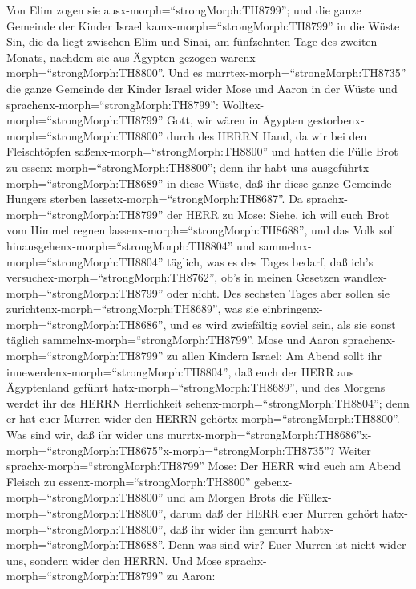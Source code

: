  Von Elim zogen sie ausx-morph=``strongMorph:TH8799''; und
die ganze Gemeinde der Kinder Israel kamx-morph=``strongMorph:TH8799''
in die Wüste Sin, die da liegt zwischen Elim und Sinai, am fünfzehnten
Tage des zweiten Monats, nachdem sie aus Ägypten gezogen
warenx-morph=``strongMorph:TH8800''.  Und es
murrtex-morph=``strongMorph:TH8735'' die ganze Gemeinde der Kinder
Israel wider Mose und Aaron in der Wüste  und
sprachenx-morph=``strongMorph:TH8799'':
Wolltex-morph=``strongMorph:TH8799'' Gott, wir wären in Ägypten
gestorbenx-morph=``strongMorph:TH8800'' durch des HERRN Hand, da wir bei
den Fleischtöpfen saßenx-morph=``strongMorph:TH8800'' und hatten die
Fülle Brot zu essenx-morph=``strongMorph:TH8800''; denn ihr habt uns
ausgeführtx-morph=``strongMorph:TH8689'' in diese Wüste, daß ihr diese
ganze Gemeinde Hungers sterben lassetx-morph=``strongMorph:TH8687''.
 Da sprachx-morph=``strongMorph:TH8799'' der HERR zu Mose:
Siehe, ich will euch Brot vom Himmel regnen
lassenx-morph=``strongMorph:TH8688'', und das Volk soll
hinausgehenx-morph=``strongMorph:TH8804'' und
sammelnx-morph=``strongMorph:TH8804'' täglich, was es des Tages bedarf,
daß ich's versuchex-morph=``strongMorph:TH8762'', ob's in meinen
Gesetzen wandlex-morph=``strongMorph:TH8799'' oder nicht. 
Des sechsten Tages aber sollen sie
zurichtenx-morph=``strongMorph:TH8689'', was sie
einbringenx-morph=``strongMorph:TH8686'', und es wird zwiefältig soviel
sein, als sie sonst täglich sammelnx-morph=``strongMorph:TH8799''.
 Mose und Aaron sprachenx-morph=``strongMorph:TH8799'' zu
allen Kindern Israel: Am Abend sollt ihr
innewerdenx-morph=``strongMorph:TH8804'', daß euch der HERR aus
Ägyptenland geführt hatx-morph=``strongMorph:TH8689'',  und
des Morgens werdet ihr des HERRN Herrlichkeit
sehenx-morph=``strongMorph:TH8804''; denn er hat euer Murren wider den
HERRN gehörtx-morph=``strongMorph:TH8800''. Was sind wir, daß ihr wider
uns
murrtx-morph=``strongMorph:TH8686''\textbar x-morph=``strongMorph:TH8675''x-morph=``strongMorph:TH8735''?
 Weiter sprachx-morph=``strongMorph:TH8799'' Mose: Der HERR
wird euch am Abend Fleisch zu essenx-morph=``strongMorph:TH8800''
gebenx-morph=``strongMorph:TH8800'' und am Morgen Brots die
Füllex-morph=``strongMorph:TH8800'', darum daß der HERR euer Murren
gehört hatx-morph=``strongMorph:TH8800'', daß ihr wider ihn gemurrt
habtx-morph=``strongMorph:TH8688''. Denn was sind wir? Euer Murren ist
nicht wider uns, sondern wider den HERRN.  Und Mose
sprachx-morph=``strongMorph:TH8799'' zu Aaron:
